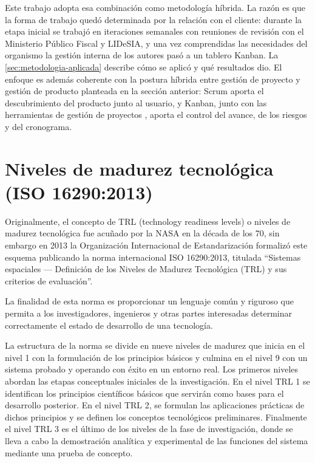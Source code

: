 Este trabajo adopta esa combinación como metodología híbrida. La razón es que la forma de trabajo quedó determinada por la relación con el cliente: durante la etapa inicial se trabajó en iteraciones semanales con reuniones de revisión con el Ministerio Público Fiscal y LIDeSIA, y una vez comprendidas las necesidades del organismo la gestión interna de los autores pasó a un tablero Kanban. La \cref{sec:metodologia-aplicada} describe cómo se aplicó y qué resultados dio. El enfoque es además coherente con la postura híbrida entre gestión de proyecto y gestión de producto planteada en la sección anterior: Scrum aporta el descubrimiento del producto junto al usuario, y Kanban, junto con las herramientas de gestión de proyectos \parencite{pmi2021}, aporta el control del avance, de los riesgos y del cronograma.

\section{Niveles de madurez tecnológica (ISO 16290:2013)}\label{niveles-de-madurez-tecnoluxf3gica-iso-162902013}\label{sec:iso16290}

Originalmente, el concepto de TRL (technology readiness levels) o niveles de madurez tecnológica fue acuñado por la NASA en la década de los 70, sin embargo en 2013 la Organización Internacional de Estandarización formalizó este esquema publicando la norma internacional ISO 16290:2013, titulada \enquote{Sistemas espaciales --- Definición de los Niveles de Madurez Tecnológica (TRL) y sus criterios de evaluación}.

La finalidad de esta norma es proporcionar un lenguaje común y riguroso que permita a los investigadores, ingenieros y otras partes interesadas determinar correctamente el estado de desarrollo de una tecnología.

La estructura de la norma se divide en nueve niveles de madurez que inicia en el nivel 1 con la formulación de los principios básicos y culmina en el nivel 9 con un sistema probado y operando con éxito en un entorno real. Los primeros niveles abordan las etapas conceptuales iniciales de la investigación. En el nivel TRL 1 se identifican los principios científicos básicos que servirán como bases para el desarrollo posterior. En el nivel TRL 2, se formulan las aplicaciones prácticas de dichos principios y se definen los conceptos tecnológicos preliminares. Finalmente el nivel TRL 3 es el último de los niveles de la fase de investigación, donde se lleva a cabo la demostración analítica y experimental de las funciones del sistema mediante una prueba de concepto.

